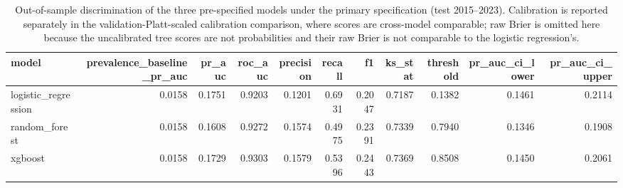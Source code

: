 \begin{table}[htbp]
\centering
\caption{Out-of-sample discrimination of the three pre-specified models under the primary specification (test 2015--2023). Calibration is reported separately in the validation-Platt-scaled calibration comparison, where scores are cross-model comparable; raw Brier is omitted here because the uncalibrated tree scores are not probabilities and their raw Brier is not comparable to the logistic regression's.}
\label{tab:model_performance_test_v2_3models}
\small
\begin{tabular}{lrrrrrrrrrr}
\toprule
model & prevalence\_baseline\_pr\_auc & pr\_auc & roc\_auc & precision & recall & f1 & ks\_stat & threshold & pr\_auc\_ci\_lower & pr\_auc\_ci\_upper \\
\midrule
logistic\_regression & 0.0158 & 0.1751 & 0.9203 & 0.1201 & 0.6931 & 0.2047 & 0.7187 & 0.1382 & 0.1461 & 0.2114 \\
random\_forest & 0.0158 & 0.1608 & 0.9272 & 0.1574 & 0.4975 & 0.2391 & 0.7339 & 0.7940 & 0.1346 & 0.1908 \\
xgboost & 0.0158 & 0.1729 & 0.9303 & 0.1579 & 0.5396 & 0.2443 & 0.7369 & 0.8508 & 0.1450 & 0.2061 \\
\bottomrule
\end{tabular}
\end{table}
